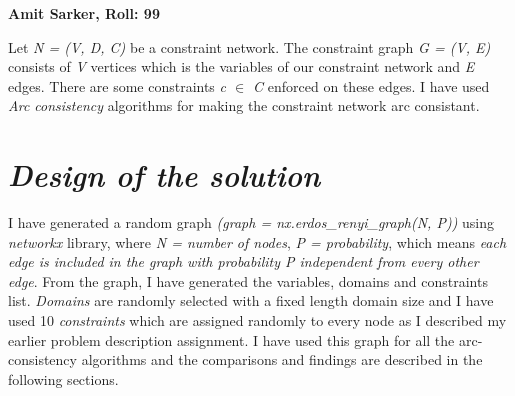 \documentclass[12pt, english]{article}
\begin{document}
{\Large \textbf{Amit Sarker, Roll: 99}}\\

\par
Let \textit{N = (V, D, C)} be a constraint network. The constraint graph \textit{G = (V, E)} consists of \textit{V} vertices which is the variables of our constraint network and \textit{E} edges. There are some constraints \textit{c $\in$ C} enforced on these edges. I have used \textit{Arc consistency} algorithms for making the constraint network arc consistant.
\section{\textit{Design of the solution}}
\par
I have generated a random graph \textit{(graph = nx.erdos\_renyi\_graph(N, P))} using \textit{networkx} library, where \textit{N = number of nodes}, \textit{P = probability}, which means \textit{each edge is included in the graph with probability P independent from every other edge}. From the graph, I have generated the variables, domains and constraints list. \textit{Domains} are randomly selected with a fixed length domain size and I have used 10 \textit{constraints} which are assigned randomly to every node as I described my earlier problem description assignment. I have used this graph for all the arc-consistency algorithms and the comparisons and findings are described in the following sections.
\end{document}
